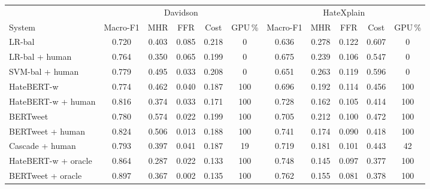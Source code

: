 \begin{tabular}{l|ccccc|ccccc}
\toprule
 & \multicolumn{5}{c|}{Davidson} & \multicolumn{5}{c}{HateXplain} \\
System & Macro-F1 & MHR & FFR & Cost & GPU\,\% & Macro-F1 & MHR & FFR & Cost & GPU\,\% \\
\midrule
LR-bal & 0.720 & 0.403 & 0.085 & 0.218 & 0 & 0.636 & 0.278 & 0.122 & 0.607 & 0 \\
LR-bal + human & 0.764 & 0.350 & 0.065 & 0.199 & 0 & 0.675 & 0.239 & 0.106 & 0.547 & 0 \\
SVM-bal + human & 0.779 & 0.495 & 0.033 & 0.208 & 0 & 0.651 & 0.263 & 0.119 & 0.596 & 0 \\
HateBERT-w & 0.774 & 0.462 & 0.040 & 0.187 & 100 & 0.696 & 0.192 & 0.114 & 0.456 & 100 \\
HateBERT-w + human & 0.816 & 0.374 & 0.033 & 0.171 & 100 & 0.728 & 0.162 & 0.105 & 0.414 & 100 \\
BERTweet & 0.780 & 0.574 & 0.022 & 0.199 & 100 & 0.705 & 0.212 & 0.100 & 0.472 & 100 \\
BERTweet + human & 0.824 & 0.506 & 0.013 & 0.188 & 100 & 0.741 & 0.174 & 0.090 & 0.418 & 100 \\
Cascade + human & 0.793 & 0.397 & 0.041 & 0.187 & 19 & 0.719 & 0.181 & 0.101 & 0.443 & 42 \\
HateBERT-w + oracle & 0.864 & 0.287 & 0.022 & 0.133 & 100 & 0.748 & 0.145 & 0.097 & 0.377 & 100 \\
BERTweet + oracle & 0.897 & 0.367 & 0.002 & 0.135 & 100 & 0.762 & 0.155 & 0.081 & 0.378 & 100 \\
\bottomrule
\end{tabular}
